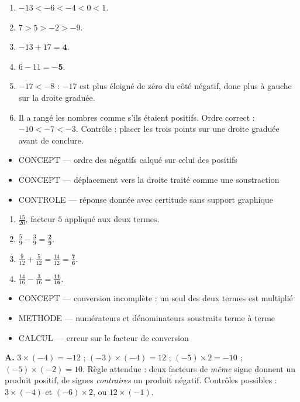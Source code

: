\documentclass[10pt,a4paper]{article}
\begin{document}
\begin{enumerate}
\item $-13 < -6 < -4 < 0 < 1$.
\item $7 > 5 > -2 > -9$.
\item $-13+17=\mathbf{4}$.
\item $6-11=\mathbf{-5}$.
\item $-17 < -8$ : $-17$ est plus éloigné de zéro du côté négatif, donc plus à gauche sur la droite graduée.
\item Il a rangé les nombres comme s'ils étaient positifs. Ordre correct : $-10 < -7 < -3$. Contrôle : placer les trois points sur une droite graduée avant de conclure.
\end{enumerate}
\begin{itemize}
\item \textsc{CONCEPT} --- ordre des négatifs calqué sur celui des positifs
\item \textsc{CONCEPT} --- déplacement vers la droite traité comme une soustraction
\item \textsc{CONTROLE} --- réponse donnée avec certitude sans support graphique
\end{itemize}
\begin{enumerate}
\item $\frac{15}{20}$, facteur $5$ appliqué aux deux termes.
\item $\frac{5}{9}-\frac{3}{9}=\mathbf{\frac{2}{9}}$.
\item $\frac{9}{12}+\frac{5}{12}=\frac{14}{12}=\mathbf{\frac{7}{6}}$.
\item $\frac{14}{16}-\frac{3}{16}=\mathbf{\frac{11}{16}}$.
\end{enumerate}
\begin{itemize}
\item \textsc{CONCEPT} --- conversion incomplète : un seul des deux termes est multiplié
\item \textsc{METHODE} --- numérateurs et dénominateurs soustraits terme à terme
\item \textsc{CALCUL} --- erreur sur le facteur de conversion
\end{itemize}

\textbf{A.} $3\times(-4)=-12$ ; $(-3)\times(-4)=12$ ; $(-5)\times 2=-10$ ; $(-5)\times(-2)=10$.
Règle attendue : deux facteurs de \emph{même} signe donnent un produit positif, de signes \emph{contraires}
un produit négatif. Contrôles possibles : $3\times(-4)$ et $(-6)\times 2$, ou $12\times(-1)$.
\end{document}
